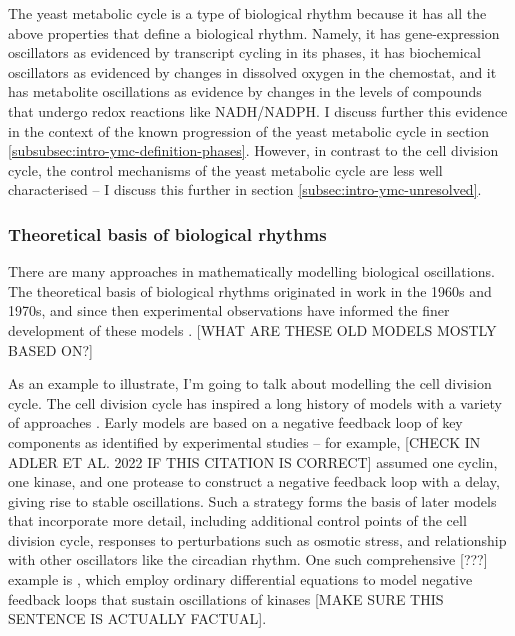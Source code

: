 The yeast metabolic cycle is a type of biological rhythm because it has all the above properties that define a biological rhythm.
Namely, it has gene-expression oscillators as evidenced by transcript cycling in its phases,
it has biochemical oscillators as evidenced by changes in dissolved oxygen in the chemostat,
and it has metabolite oscillations as evidence by changes in the levels of compounds that undergo redox reactions like NADH/NADPH.
I discuss further this evidence in the context of the known progression of the yeast metabolic cycle in section \ref{subsubsec:intro-ymc-definition-phases}.
However, in contrast to the cell division cycle, the control mechanisms of the yeast metabolic cycle are less well characterised -- I discuss this further in section \ref{subsec:intro-ymc-unresolved}.

\subsubsection{Theoretical basis of biological rhythms}
\label{subsubsec:intro-ymc-biological_rhythms-theoretical_basis}

There are many approaches in mathematically modelling biological oscillations.
The theoretical basis of biological rhythms originated in work in the 1960s and 1970s, and since then experimental observations have informed the finer development of these models \parencite{tysonTimekeepingDecisionmakingLiving}.
[WHAT ARE THESE OLD MODELS MOSTLY BASED ON?]

As an example to illustrate, I'm going to talk about modelling the cell division cycle.
The cell division cycle has inspired a long history of models with a variety of approaches \parencite{adlerYeastCellCycle2022}.
Early models are based on a negative feedback loop of key components as identified by experimental studies -- for example, \textcite{goldbeterBiochemicalOscillationsCellular1996} [CHECK IN ADLER ET AL. 2022 IF THIS CITATION IS CORRECT] assumed one cyclin, one kinase, and one protease to construct a negative feedback loop with a delay, giving rise to stable oscillations.
Such a strategy forms the basis of later models that incorporate more detail, including additional control points of the cell division cycle, responses to perturbations such as osmotic stress, and relationship with other oscillators like the circadian rhythm.
One such comprehensive [???] example is \textcite{novakMitoticKinaseOscillation2022}, which employ ordinary differential equations to model negative feedback loops that sustain oscillations of kinases [MAKE SURE THIS SENTENCE IS ACTUALLY FACTUAL].

